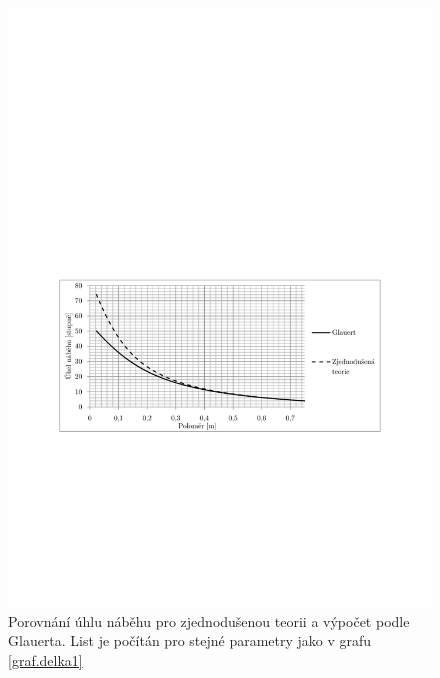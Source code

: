 		\begin{figure}[h]
								\centering
									\includegraphics[]{obrazky/grafy/glauert2}
								\caption{Porovnání úhlu náběhu pro zjednodušenou teorii a výpočet podle Glauerta. List je počítán pro stejné parametry jako v grafu \ref{graf.delka1}}
								\label{graf.glauert2}
				\end{figure}